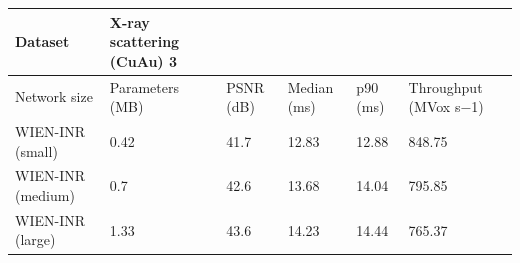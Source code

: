\begin{tabular}{llllll}
\toprule
Dataset & X-ray scattering (CuAu) 3 &  &  &  &  \\
\midrule
Network size & Parameters (MB) & PSNR (dB) & Median (ms) & p90 (ms) & Throughput (MVox s−1) \\
WIEN-INR (small) & 0.42 & 41.7 & 12.83 & 12.88 & 848.75 \\
WIEN-INR (medium) & 0.7 & 42.6 & 13.68 & 14.04 & 795.85 \\
WIEN-INR (large) & 1.33 & 43.6 & 14.23 & 14.44 & 765.37 \\
\bottomrule
\end{tabular}
